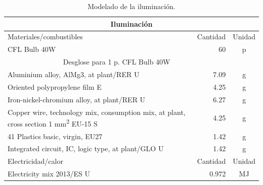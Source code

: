 \begin{table}[!htb]
\centering
\begin{tabular}{p{8cm}rc}
\toprule
\multicolumn{3}{c}{Iluminación}\\
\midrule
Materiales/combustibles & Cantidad & Unidad\\
\midrule
CFL Bulb 40W & 60 & p\\
\multicolumn{2}{c}{Desglose para 1 p. CFL Bulb 40W}\\
\cmidrule(r){1-2}
Aluminium alloy, AlMg3, at plant/RER U & 7.09 & \si{g}\\
Oriented polypropylene film E & 4.25 & \si{g}\\
Iron-nickel-chromium alloy, at plant/RER U & 6.27 & \si{g}\\
Copper wire, technology mix, consumption mix, at plant, cross section 1 \si{mm^2} EU-15 S & 4.25 & \si{g}\\
41 Plastics basic, virgin, EU27 & 1.42 & \si{g}\\
Integrated circuit, IC, logic type, at plant/GLO U & 1.42 & \si{g}\\
\midrule
Electricidad/calor & Cantidad & Unidad\\
\midrule
Electricity mix 2013/ES U & 0.972 & \si{MJ}\\
\bottomrule
\end{tabular}
\caption{Modelado de la iluminación.}
\label{modeladodeiluminacion}
\end{table}


